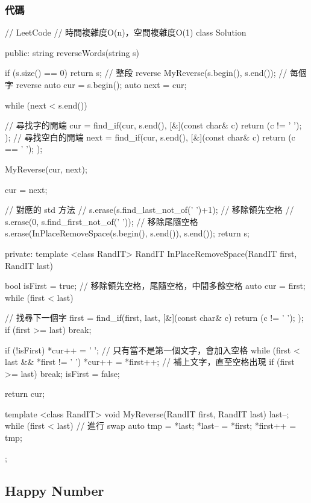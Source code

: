 \subsubsection{代碼}
\begin{Code}
// LeetCode
// 時間複雜度O(n)，空間複雜度O(1)
class Solution {
public:
    string reverseWords(string s) {
        if (s.size() == 0) return s;
        // 整段 reverse
        MyReverse(s.begin(), s.end());
        // 每個字 reverse
        auto cur = s.begin();
        auto next = cur;

        while (next < s.end())
        {
            // 尋找字的開端
            cur = find_if(cur, s.end(), [&](const char& c) { return (c != ' '); });
            // 尋找空白的開端
            next = find_if(cur, s.end(), [&](const char& c) { return (c == ' '); });

            MyReverse(cur, next);

            cur = next;
        }

        // 對應的 std 方法
        // s.erase(s.find_last_not_of(' ')+1); // 移除領先空格
        // s.erase(0, s.find_first_not_of(' ')); // 移除尾隨空格
        s.erase(InPlaceRemoveSpace(s.begin(), s.end()), s.end());
        return s;
    }
private:
    template <class RandIT>
        RandIT InPlaceRemoveSpace(RandIT first, RandIT last)
    {
        bool isFirst = true;
        // 移除領先空格，尾隨空格，中間多餘空格
        auto cur = first;
        while (first < last)
        {
            // 找尋下一個字
            first = find_if(first, last, [&](const char& c) { return (c != ' '); });
            if (first >= last) break;

            if (!isFirst) *cur++ = ' '; // 只有當不是第一個文字，會加入空格
            while (first < last && *first != ' ') *cur++ = *first++; // 補上文字，直至空格出現
            if (first >= last) break;
            isFirst = false;
        }

        return cur;
    }
    template <class RandIT>
        void MyReverse(RandIT first, RandIT last)
    {
        last--;
        while (first < last)
        {
            // 進行 swap
            auto tmp = *last;
            *last-- = *first;
            *first++ = tmp;
        }
    }
};
\end{Code}

\subsection{Happy Number}
\label{sec:happy-number}

